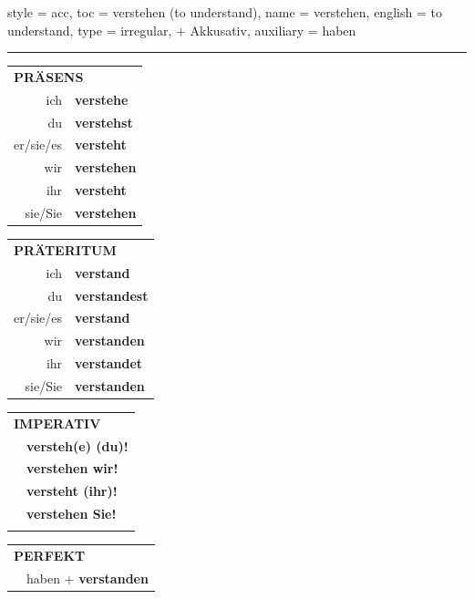 \begin{verbentry}{
  style = {acc},
  toc = {verstehen (to understand)},
  name = {verstehen},
  english = {to understand},
  type = {irregular, + Akkusativ},
  auxiliary = {haben}
}
 
    
     \vspace{5pt}

    \hrule
    
    \vspace{5pt}

  \begin{tabular}{rl}
     \multicolumn{2}{l}{\textbf{PRÄSENS} }\\
    ich & \textbf{verstehe}\\
    du & \textbf{verstehst}\\
    er/sie/es & \textbf{versteht}\\
    wir & \textbf{verstehen}\\
    ihr & \textbf{versteht}\\
    sie/Sie & \textbf{verstehen}\\
  \end{tabular}
  \hfill
     \begin{tabular}{rl}
    \multicolumn{2}{l}{\textbf{PRÄTERITUM} }\\
    ich & \textbf{verstand}\\
    du & \textbf{verstandest}\\
    er/sie/es & \textbf{verstand}\\
    wir & \textbf{verstanden}\\
    ihr & \textbf{verstandet}\\
    sie/Sie & \textbf{verstanden}\\
  \end{tabular}
  \hfill
  \begin{tabular}{rl}
     \multicolumn{2}{l}{\textbf{IMPERATIV} }\\
   & \textbf{versteh(e) (du)!}\\
   & \textbf{verstehen wir!}\\
   & \textbf{versteht (ihr)!}\\
   & \textbf{verstehen Sie!}\\
   & \vspace{10pt}
  \end{tabular}

    \vspace{10pt}

 \begin{tabular}{rl}
     \multicolumn{2}{l}{\textbf{PERFEKT}}\\
  &  haben + \textbf{verstanden}\\
  \end{tabular}
\hfill
   \begin{tabular}{rl}
   

\end{tabular}
\end{verbentry}
